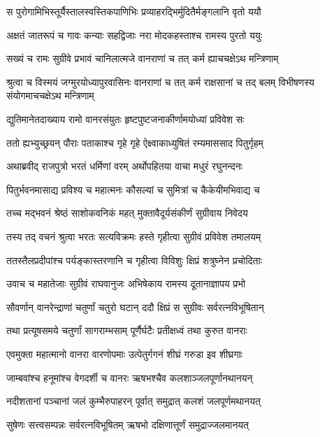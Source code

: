 \twolineshloka
{स पुरोगामिभिस्तूर्यैस्तालस्वस्तिकपाणिभिः}
{प्रव्याहरद्भिर्मुदितैर्मङ्गलानि वृतो ययौ} %

\twolineshloka
{अक्षतं जातरूपं च गावः कन्याः सहद्विजाः}
{नरा मोदकहस्ताश्च रामस्य पुरतो ययुः} %

\twolineshloka
{सख्यं च रामः सुग्रीवे प्रभावं चानिलात्मजे}
{वानराणां च तत् कर्म ह्याचचक्षेऽथ मन्त्रिणाम्} %

\threelineshloka
{श्रुत्वा च विस्मयं जग्मुरयोध्यापुरवासिनः}
{वानराणां च तत् कर्म राक्षसानां च तद् बलम्}
{विभीषणस्य संयोगमाचचक्षेऽथ मन्त्रिणाम्} %

\twolineshloka
{द्युतिमानेतदाख्याय रामो वानरसंयुतः}
{हृष्टपुष्टजनाकीर्णामयोध्यां प्रविवेश सः} %

\twolineshloka
{ततो ह्यभ्युच्छ्रयन् पौराः पताकाश्च गृहे गृहे}
{ऐक्ष्वाकाध्युषितं रम्यमाससाद पितुर्गृहम्} %

\twolineshloka
{अथाब्रवीद् राजपुत्रो भरतं धर्मिणां वरम्}
{अर्थोपहितया वाचा मधुरं रघुनन्दनः} %

\twolineshloka
{पितुर्भवनमासाद्य प्रविश्य च महात्मनः}
{कौसल्यां च सुमित्रां च कैकेयीमभिवाद्य च} %

\twolineshloka
{तच्च मद्भवनं श्रेष्ठं साशोकवनिकं महत्}
{मुक्तावैदूर्यसंकीर्णं सुग्रीवाय निवेदय} %

\twolineshloka
{तस्य तद् वचनं श्रुत्वा भरतः सत्यविक्रमः}
{हस्ते गृहीत्वा सुग्रीवं प्रविवेश तमालयम्} %

\twolineshloka
{ततस्तैलप्रदीपांश्च पर्यङ्कास्तरणानि च}
{गृहीत्वा विविशुः क्षिप्रं शत्रुघ्नेन प्रचोदिताः} %

\twolineshloka
{उवाच च महातेजाः सुग्रीवं राघवानुजः}
{अभिषेकाय रामस्य दूतानाज्ञापय प्रभो} %

\twolineshloka
{सौवर्णान् वानरेन्द्राणां चतुर्णां चतुरो घटान्}
{ददौ क्षिप्रं स सुग्रीवः सर्वरत्नविभूषितान्} %

\twolineshloka
{तथा प्रत्यूषसमये चतुर्णां सागराम्भसाम्}
{पूर्णैर्घटैः प्रतीक्षध्वं तथा कुरुत वानराः} %

\twolineshloka
{एवमुक्ता महात्मानो वानरा वारणोपमाः}
{उत्पेतुर्गगनं शीघ्रं गरुडा इव शीघ्रगाः} %

\twolineshloka
{जाम्बवांश्च हनूमांश्च वेगदर्शी च वानरः}
{ऋषभश्चैव कलशाञ्जलपूर्णानथानयन्} %

\twolineshloka
{नदीशतानां पञ्चानां जलं कुम्भैरुपाहरन्}
{पूर्वात् समुद्रात् कलशं जलपूर्णमथानयत्} %

\twolineshloka
{सुषेणः सत्त्वसम्पन्नः सर्वरत्नविभूषितम्}
{ऋषभो दक्षिणात्तूर्णं समुद्राज्जलमानयत्} %

